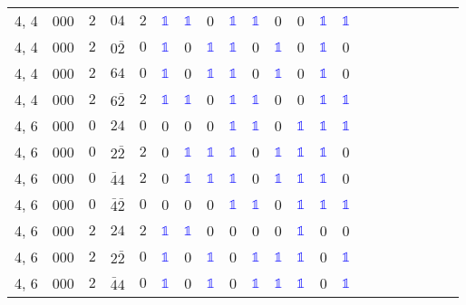 \begin{longtable*}{c| cccccccccccccccccccc }
4, 4& 000& $2$& $04$& $2$& \textcolor{blue}{$\mathds{1}$}& \textcolor{blue}{$\mathds{1}$}& 0& \textcolor{blue}{$\mathds{1}$}& \textcolor{blue}{$\mathds{1}$}& 0& 0& \textcolor{blue}{$\mathds{1}$}& \textcolor{blue}{$\mathds{1}$}\\
4, 4& 000& $2$& $0\bar{2}$& $0$& \textcolor{blue}{$\mathds{1}$}& 0& \textcolor{blue}{$\mathds{1}$}& \textcolor{blue}{$\mathds{1}$}& 0& \textcolor{blue}{$\mathds{1}$}& 0& \textcolor{blue}{$\mathds{1}$}& 0\\
4, 4& 000& $2$& $64$& $0$& \textcolor{blue}{$\mathds{1}$}& 0& \textcolor{blue}{$\mathds{1}$}& \textcolor{blue}{$\mathds{1}$}& 0& \textcolor{blue}{$\mathds{1}$}& 0& \textcolor{blue}{$\mathds{1}$}& 0\\
4, 4& 000& $2$& $6\bar{2}$& $2$& \textcolor{blue}{$\mathds{1}$}& \textcolor{blue}{$\mathds{1}$}& 0& \textcolor{blue}{$\mathds{1}$}& \textcolor{blue}{$\mathds{1}$}& 0& 0& \textcolor{blue}{$\mathds{1}$}& \textcolor{blue}{$\mathds{1}$}\\
4, 6& 000& $0$& $24$& $0$& 0& 0& 0& \textcolor{blue}{$\mathds{1}$}& \textcolor{blue}{$\mathds{1}$}& 0& \textcolor{blue}{$\mathds{1}$}& \textcolor{blue}{$\mathds{1}$}& \textcolor{blue}{$\mathds{1}$}\\
4, 6& 000& $0$& $2\bar{2}$& $2$& 0& \textcolor{blue}{$\mathds{1}$}& \textcolor{blue}{$\mathds{1}$}& \textcolor{blue}{$\mathds{1}$}& 0& \textcolor{blue}{$\mathds{1}$}& \textcolor{blue}{$\mathds{1}$}& \textcolor{blue}{$\mathds{1}$}& 0\\
4, 6& 000& $0$& $\bar{4}4$& $2$& 0& \textcolor{blue}{$\mathds{1}$}& \textcolor{blue}{$\mathds{1}$}& \textcolor{blue}{$\mathds{1}$}& 0& \textcolor{blue}{$\mathds{1}$}& \textcolor{blue}{$\mathds{1}$}& \textcolor{blue}{$\mathds{1}$}& 0\\
4, 6& 000& $0$& $\bar{4}\bar{2}$& $0$& 0& 0& 0& \textcolor{blue}{$\mathds{1}$}& \textcolor{blue}{$\mathds{1}$}& 0& \textcolor{blue}{$\mathds{1}$}& \textcolor{blue}{$\mathds{1}$}& \textcolor{blue}{$\mathds{1}$}\\
4, 6& 000& $2$& $24$& $2$& \textcolor{blue}{$\mathds{1}$}& \textcolor{blue}{$\mathds{1}$}& 0& 0& 0& 0& \textcolor{blue}{$\mathds{1}$}& 0& 0\\
4, 6& 000& $2$& $2\bar{2}$& $0$& \textcolor{blue}{$\mathds{1}$}& 0& \textcolor{blue}{$\mathds{1}$}& 0& \textcolor{blue}{$\mathds{1}$}& \textcolor{blue}{$\mathds{1}$}& \textcolor{blue}{$\mathds{1}$}& 0& \textcolor{blue}{$\mathds{1}$}\\
4, 6& 000& $2$& $\bar{4}4$& $0$& \textcolor{blue}{$\mathds{1}$}& 0& \textcolor{blue}{$\mathds{1}$}& 0& \textcolor{blue}{$\mathds{1}$}& \textcolor{blue}{$\mathds{1}$}& \textcolor{blue}{$\mathds{1}$}& 0& \textcolor{blue}{$\mathds{1}$}\\

\end{longtable*}
